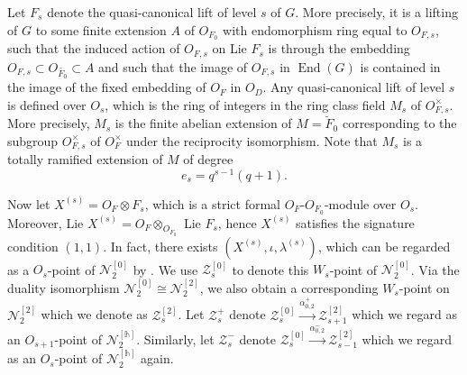 \documentclass[11pt,oneside]{amsart}
\theoremstyle{plain}
\theoremstyle{definition}
\theoremstyle{remark}
\newcommand{\cZ}{\mathcal{Z}}
\newcommand{\cN}{\mathcal{N}}
\numberwithin{equation}{section}
\begin{document}
	  Let $F_s$ denote the  quasi-canonical lift  of level $s$ of $G$. More precisely, it is a lifting of $G$ to some finite extension $A$ of $O_{F_0}$ with endomorphism ring equal to $O_{F, s}$, such that the induced action of $O_{F, s}$ on Lie $F_s$ is through the embedding $O_{F, s} \subset O_{\breve{F_0}} \subset A$ and such that the image of $O_{F, s}$ in $\operatorname{End}(G)$ is contained in the image of the fixed embedding of $O_F$ in $O_D$. Any quasi-canonical lift of level $s$ is defined over $O_s$, which is the ring of integers in the ring class field $M_s$ of $O_{F, s}^{\times}$. More precisely, $M_s$ is the finite abelian extension of $M=\breve{F}_0$ corresponding to the subgroup $O_{F, s}^{\times}$ of $O_F^{\times}$ under the reciprocity isomorphism. Note that $M_s$ is a totally ramified extension of $M$ of degree
	$$
	e_s=q^{s-1}(q+1).
	$$
	
    
    Now let $X^{(s)}=O_F \otimes F_s$, which is a strict formal $O_F$-$O_{F_0}$-module   over $O_s$. Moreover, Lie $X^{(s)}=O_F \otimes_{O_{F_0}}$ Lie $F_s$, hence $X^{(s)}$ satisfies the signature condition $(1,1)$. In fact, there exists $
\left(X^{(s)}, \iota, \lambda^{(s)}\right)$, which can be regarded as a $O_s$-point of $\cN_2^{[0]}$ by  \cite[Lemma 6.5]{KR1}.  
	We use $\cZ_{s}^{[0]}$ to denote this $W_s$-point of $\cN_2^{[0]}$. Via the duality isomorphism $\cN_2^{[0]}\cong \cN_2^{[2]}$, we also obtain a corresponding $W_s$-point on  $\cN_2^{[2]}$ which we denote as $\cZ_{s}^{[2]}$.  Let $\cZ_{s}^+$ denote   $\cZ_{s}^{[0]}\stackrel{\alpha_{0,2}^+}{\to} \cZ_{s+1}^{[2]}$ which we regard as an $O_{s+1}$-point of $\cN_2^{[\mathds{h}]}$. Similarly, let $\cZ_{s}^{-}$ denote $\cZ_{s}^{[0]}\stackrel{\alpha_{0,2}^-}{\to}  \cZ_{s-1}^{[2]}$ which we regard as an $O_{s}$-point of $\cN_2^{[\mathds{h}]}$ again. 
	
	
	
	
	
\end{document}
